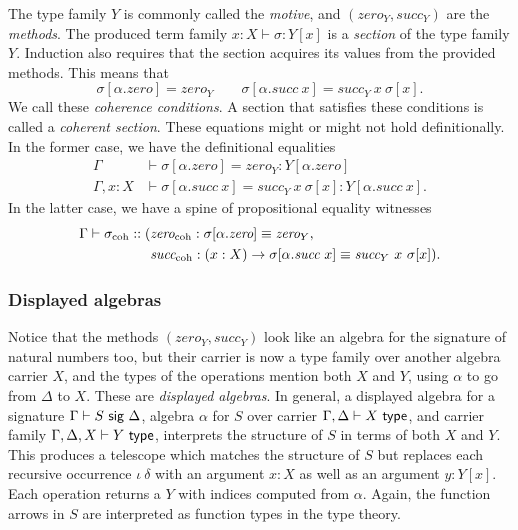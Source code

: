 The type family $Y$ is commonly called the \emph{motive}, and $(\textit{zero}_Y,
\textit{succ}_Y)$ are the \emph{methods}.
The produced term family $x : X \vdash \sigma : Y[x]$ is a \emph{section} of the type family $Y$.
Induction also requires that the section acquires its values from the provided methods.
This means that
\[\sigma[\alpha.\textit{zero}] = \textit{zero}_Y \qquad \sigma [\alpha.\textit{succ}\ x] = \textit{succ}_Y\ x\ \sigma[x].\]
We call these \emph{coherence conditions}.
A section that satisfies these conditions is called a \emph{coherent section}.
These equations might or might not hold definitionally. In the former case, we have the
definitional equalities
\begin{align*}
\Gamma &\vdash \sigma[\alpha.\textit{zero}] = \textit{zero}_Y : Y[\alpha.\textit{zero}] \\
\Gamma, x : X &\vdash \sigma[\alpha.\textit{succ}\ x] = \textit{succ}_Y\ x\ \sigma[x] : Y[\alpha.\textit{succ}\ x].
\end{align*}
In the latter case, we have a spine of propositional equality witnesses
\begin{align*}
\Gamma \vdash \sigma_{\text{coh}} :: (&\textit{zero}_{\text{coh}} :  \sigma[\alpha.\textit{zero}] \equiv \textit{zero}_Y, \\
&\textit{succ}_{\text{coh}} : (x : X) \to \sigma[\alpha.\textit{succ}\ x] \equiv \textit{succ}_Y\ x\ \sigma[x]).
\end{align*}

\subsubsection{Displayed algebras}
Notice that the methods $(\textit{zero}_Y, \textit{succ}_Y)$ look like an
algebra for the signature of natural numbers too, but their carrier is now a
type family over another algebra carrier $X$, and the types of the operations mention both
$X$ and $Y$, using $\alpha$ to go from $\Delta$ to $X$. These are \emph{displayed algebras}. In
general, a displayed algebra for a signature $\Gamma \vdash S \ \textsf{sig}\  \Delta$,
algebra $\alpha$ for $S$ over carrier $\Gamma, \Delta \vdash X \ \textsf{type}$, and
carrier family $\Gamma, \Delta, X \vdash Y \ \textsf{type}$, interprets the structure of
$S$ in terms of both $X$ and $Y$. This produces a telescope which matches the
structure of $S$ but replaces each recursive occurrence $\iota\ \delta$ with an
argument $x : X$ as well as an argument $y : Y[x]$. Each operation returns a $Y$ with indices
computed from $\alpha$. Again, the function arrows in $S$ are interpreted as
function types in the type theory.

